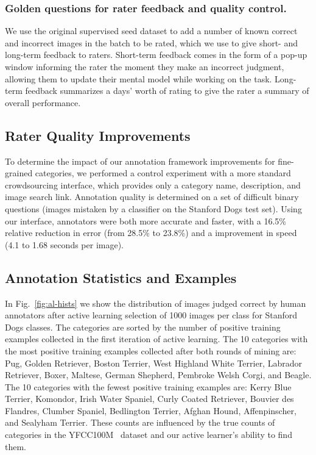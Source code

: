 \documentclass[runningheads]{llncs}
\begin{document}
\subsubsection{Golden questions for rater feedback and quality control.}
We use the original supervised seed dataset to add a number of known correct and incorrect images in the batch to be rated, which we use to give short- and long-term feedback to raters.
Short-term feedback comes in the form of a pop-up window informing the rater the moment they make an incorrect judgment, allowing them to update their mental model while working on the task.
Long-term feedback summarizes a days' worth of rating to give the rater a summary of overall performance.


\subsection{Rater Quality Improvements}
\label{app_sec:raters}

To determine the impact of our annotation framework improvements for fine-grained categories, we performed a control experiment with a more standard crowdsourcing interface, which provides only a category name, description, and image search link.
Annotation quality is determined on a set of difficult binary questions (images mistaken by a classifier on the Stanford Dogs test set).
Using our interface, annotators were both more accurate and faster, with a 16.5\% relative reduction in error (from 28.5\% to 23.8\%) and a  improvement in speed (4.1 to 1.68 seconds per image).


\subsection{Annotation Statistics and Examples}
In Fig.~\ref{fig:al-hists} we show the distribution of images judged correct by human annotators after active learning selection of 1000 images per class for Stanford Dogs classes.  The categories are sorted by the number of positive training examples collected in the first iteration of active learning.  The 10 categories with the most positive training examples collected after both rounds of mining are: Pug, Golden Retriever, Boston Terrier, West Highland White Terrier, Labrador Retriever, Boxer, Maltese, German Shepherd, Pembroke Welsh Corgi, and Beagle.  The 10 categories with the fewest positive training examples are: Kerry Blue Terrier, Komondor, Irish Water Spaniel, Curly Coated Retriever, Bouvier des Flandres, Clumber Spaniel, Bedlington Terrier, Afghan Hound, Affenpinscher, and Sealyham Terrier.
These counts are influenced by the true counts of categories in the YFCC100M~\cite{thomee2015yfcc100m} dataset and our active learner's ability to find them.
\end{document}
